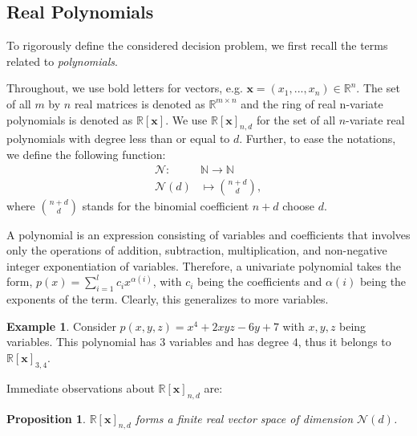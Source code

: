 \documentclass[12pt]{amsart}
\numberwithin{equation}{section}
\newtheorem{prop}[thm]{Proposition}
\theoremstyle{definition}
\newtheorem{example}[thm]{Example}
\numberwithin{thm}{section}
\begin{document}
\subsection{Real Polynomials}
\label{Sec:Real Polynomials}
To rigorously define the considered decision problem,
we first recall the terms related to \emph{polynomials}.

Throughout, we use bold letters for vectors, e.g. $\mathbf{x} = (x_1, ..., x_n) \in \mathbb{R}^n$.
The set of all $m$ by $n$ real matrices is denoted as $\mathbb{R}^{m \times n}$ and the ring of real n-variate polynomials is denoted as $\mathbb{R}[\mathbf{x}]$. 
We use $\mathbb{R}[\mathbf{x}]_{n, d}$ for the set of all $n$-variate real polynomials with degree less than or equal to $d$.
Further, to ease the notations, we define the following function: 
\begin{equation*}
     \begin{split}
          \mathcal{N} \colon & \mathbb{N} \to \mathbb{N} \\
          \mathcal{N}(d) & \mapsto { n+d \choose d },
     \end{split}
\end{equation*}
where ${ n+d \choose d }$ stands for the binomial coefficient $n+d$ choose $d$. 

A polynomial is an expression consisting of variables and coefficients that involves only the operations of addition, subtraction, multiplication, and non-negative integer exponentiation of variables.
Therefore, a univariate polynomial takes the form, $p(x) = \sum_{i = 1} ^{l} c_i x^{\alpha(i)}$, with $c_i$ being the coefficients and $\alpha(i)$ being the exponents of the term. 
Clearly, this generalizes to more variables.

\begin{example}
     Consider $p(x, y, z) = x^4 + 2xyz - 6y + 7$ with $x, y, z$ being variables. 
     This polynomial has $3$ variables and has degree $4$, thus it 
     belongs to $\mathbb{R}[\mathbf{x}]_{3, 4}$.
\end{example}

Immediate observations about $\mathbb{R}[\mathbf{x}]_{n, d}$ are:
\begin{prop}
     \label{prop:vs}
     $\mathbb{R}[\mathbf{x}]_{n, d}$ forms a finite real vector space of dimension $\mathcal{N}(d)$.
\end{prop}
    
\end{document}
